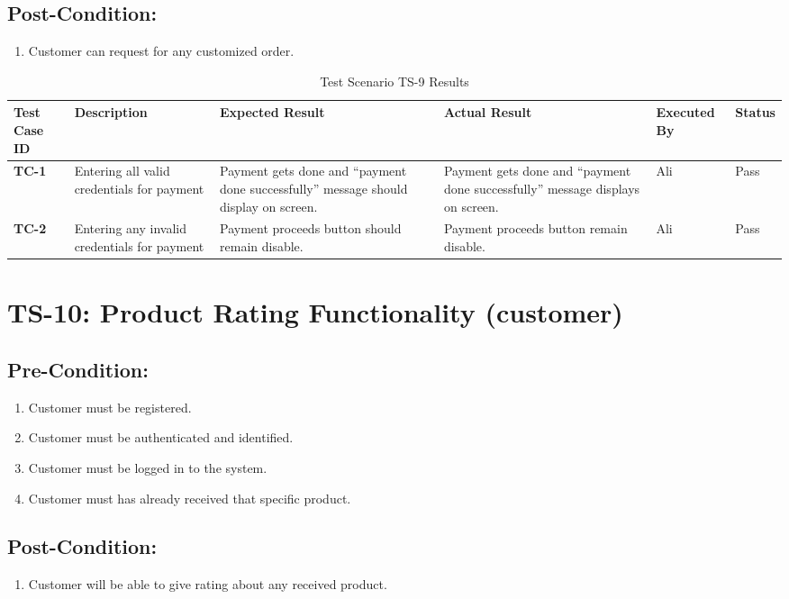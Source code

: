 \subsection{Post-Condition:}
\begin{enumerate}
  \item Customer can request for any customized order.
\end{enumerate}

\begin{table}[H]
    \centering
   \begin{tabular}{ | m{1cm} | m{2.5cm}| m{2.7cm} | m{2.7cm} | m{1.7cm} | m{1.3cm} |}  
  \hline  \textbf{Test Case ID} &  \textbf{Description} &  \textbf{Expected Result} &  \textbf{Actual Result} &  \textbf{Executed By} &  \textbf{Status}  \\  \hline
  \textbf{TC-1} & Entering all valid credentials for payment & Payment gets done and “payment done successfully” message should display on screen. & Payment gets done and “payment done successfully” message displays on screen. & Ali & Pass
  \\  \hline
  \textbf{TC-2} & Entering any invalid credentials for payment & Payment proceeds button should remain disable. & Payment proceeds button remain disable. & Ali & Pass
  \\  \hline
  
\end{tabular}
    \caption{Test Scenario TS-9 Results}
    \label{tab: Test Scenario TS-9 Results}
\end{table}

\section{TS-10: Product Rating Functionality (customer)}
\subsection{Pre-Condition:}
\begin{enumerate}
  \item Customer must be registered.
  \item Customer must be authenticated and identified.
  \item Customer must be logged in to the system.
  \item Customer must has already received that specific product.
\end{enumerate}
\subsection{Post-Condition:}
\begin{enumerate}
  \item Customer will be able to give rating about any received product. 
\end{enumerate}

